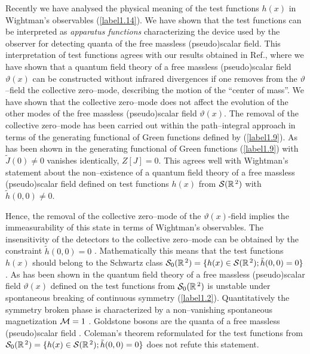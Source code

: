 \documentclass[a4paper,12pt] {article}
\begin{document}
Recently \cite{th0204237,th0206244} we have analysed the physical
meaning of the test functions $h(x)$ in Wightman's observables
(\ref{label1.14}). We have shown that the test functions can be
interpreted as {\it apparatus functions} characterizing the device
used by the observer for detecting quanta of the free massless
(pseudo)scalar field. This interpretation of test functions agrees
with our results obtained in Ref.\cite{th0112184}, where we have shown
that a quantum field theory of a free massless (pseudo)scalar field
$\vartheta(x)$ can be constructed without infrared divergences if one
removes from the $\vartheta$--field the collective zero--mode,
describing the motion of the ``center of mass''. We have shown that
the collective zero--mode does not affect the evolution of the other
modes of the free massless (pseudo)scalar field $\vartheta(x)$. The
removal of the collective zero--mode has been carried out within the
path--integral approach in terms of the generating functional of Green
functions defined by (\ref{label1.9}). As has been shown in
\cite{th0112184} the generating functional of Green functions
(\ref{label1.9}) with $\tilde{J}(0) \neq 0$ vanishes identically,
$Z[J] = 0$. This agrees well with Wightman's statement \cite{Wi64}
about the non--existence of a quantum field theory of a free massless
(pseudo)scalar field defined on test functions $h(x)$ from ${\cal
S}(\mathbb{R}^{\,2})$ with $\tilde{h}(0,0) \neq 0$.

Hence, the removal of the collective zero--mode of the
$\vartheta(x)$-field implies the immeasurability of this state in
terms of Wightman's observables.  The insensitivity of the detectors
to the collective zero--mode can be obtained by the constraint
$\tilde{h}(0,0) = 0$ \cite{th0204237,th0206244}. Mathematically this
means that the test functions $h(x)$ should belong to the Schwartz
class ${\cal S}_0(\mathbb{R}^{\,2}) = \{h(x) \in {\cal
S}(\mathbb{R}^{\,2}); \tilde{h}(0,0) = 0\}$
\cite{th0112184,th0204237,th0206244}. As has been shown in
\cite{th0204237,th0206244} the quantum field theory of a free massless
(pseudo)scalar field $\vartheta(x)$ defined on the test functions from
${\cal S}_0(\mathbb{R}^{\,2})$ is unstable under spontaneous breaking
of continuous symmetry (\ref{label1.2}). Quantitatively the symmetry
broken phase is characterized by a non--vanishing spontaneous
magnetization ${\cal M} = 1$ \cite{th0112184,th0204237,th0206244}.
Goldstone bosons are the quanta of a free massless (pseudo)scalar
field \cite{th0112184,th0204237,th0206244}. Coleman's theorem
reformulated for the test functions from ${\cal S}_0(\mathbb{R}^{\,2})
= \{h(x) \in {\cal S}(\mathbb{R}^{\,2}); \tilde{h}(0,0) = 0\}$ does
not refute this statement.
\end{document}
